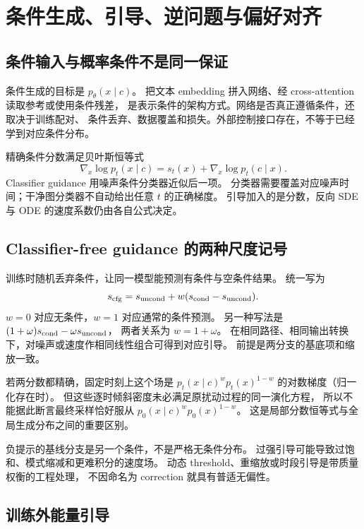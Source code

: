 \chapter{条件生成、引导、逆问题与偏好对齐}
\label{th:guidance}

\section{条件输入与概率条件不是同一保证}

条件生成的目标是 $p_\theta(x\mid c)$。
把文本 embedding 拼入网络、经 cross-attention 读取参考或使用条件残差，
是表示条件的架构方式。网络是否真正遵循条件，还取决于训练配对、
条件丢弃、数据覆盖和损失。外部控制接口存在，不等于已经学到对应条件分布。

精确条件分数满足贝叶斯恒等式
\begin{equation}\label{th:classifier-guidance}
\nabla_x\log p_t(x\mid c)=s_t(x)+\nabla_x\log p_t(c\mid x).
\end{equation}
Classifier guidance 用噪声条件分类器近似后一项。
分类器需要覆盖对应噪声时间；干净图分类器不自动给出任意 $t$ 的正确梯度。
引导加入的是分数，反向 SDE 与 ODE 的速度系数仍由各自公式决定。

\section{Classifier-free guidance 的两种尺度记号}

训练时随机丢弃条件，让同一模型能预测有条件与空条件结果。
统一写为
\begin{equation}\label{th:cfg}
s_{\rm cfg}=s_{\rm uncond}+w(s_{\rm cond}-s_{\rm uncond}).
\end{equation}
$w=0$ 对应无条件，$w=1$ 对应通常的条件预测。
另一种写法是 $(1+\omega)s_{\rm cond}-\omega s_{\rm uncond}$，
两者关系为 $w=1+\omega$。
在相同路径、相同输出转换下，对噪声或速度作相同线性组合可得到对应引导。
前提是两分支的基底项和缩放一致。

若两分数都精确，固定时刻上这个场是
$p_t(x\mid c)^w p_t(x)^{1-w}$ 的对数梯度（归一化存在时）。
但这些逐时倾斜密度未必满足原扰动过程的同一演化方程，
所以不能据此断言最终采样恰好服从 $p_0(x\mid c)^w p_0(x)^{1-w}$。
这是局部分数恒等式与全局生成分布之间的重要区别。

负提示的基线分支是另一个条件，不是严格无条件分布。
过强引导可能导致过饱和、模式缩减和更难积分的速度场。
动态 threshold、重缩放或时段引导是带质量权衡的工程处理，
不因命名为 correction 就具有普适无偏性。

\section{训练外能量引导}


